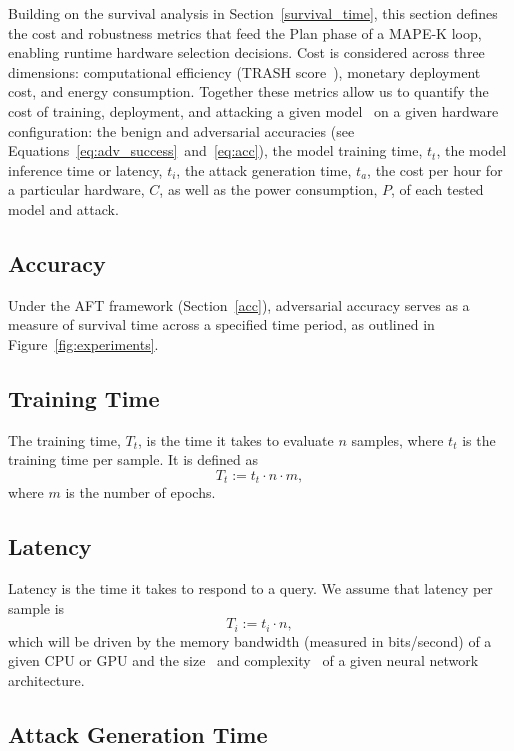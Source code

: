 \documentclass[conference]{IEEEtran}%
\begin{document}
Building on the survival analysis in Section~\ref{survival_time}, this section defines the cost and robustness metrics that feed the Plan phase of a MAPE-K loop, enabling runtime hardware selection decisions. 
Cost is considered across three dimensions: computational efficiency (TRASH score~\cite{meyers_aft}), monetary deployment cost, and energy consumption. 
Together these metrics allow us to quantify the cost of training, deployment, and attacking a given model~\cite{IEC61508} on a given hardware configuration: the benign and adversarial accuracies (see Equations~\ref{eq:adv_success}~and~\ref{eq:acc}), the model training time, $t_{t}$, the model inference time or latency, $t_{i}$, the attack generation time, $t_{a}$, the cost per hour for a particular hardware, $C$, as well as the power consumption, $P$, of each tested model and attack.


\subsection{Accuracy}

Under the AFT framework (Section~\ref{acc}), adversarial accuracy serves as a measure of survival time across a specified time period, as outlined in Figure~\ref{fig:experiments}.


\subsection{Training Time}

The training time, $T_t$, is the time it takes to evaluate $n$ samples, where $t_t$ is the training time per sample. It is defined as
\[
    T_t := t_t \cdot n  \cdot m,
\]
where $m$ is the number of epochs.


\subsection{Latency}

Latency is the time it takes to respond to a query. We assume that latency per sample is
\[
    T_i := t_i \cdot n,
\]
which will be driven by the memory bandwidth (measured in bits/second) of a given CPU or GPU and the size~\cite{vgg} and complexity~\cite{resnet} of a given neural network architecture.


\subsection{Attack Generation Time}
\end{document}
